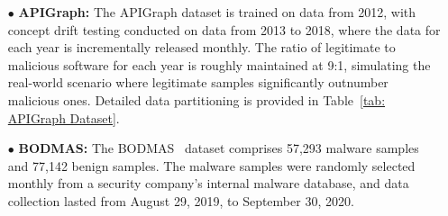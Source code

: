 \documentclass[conference,compsoc]{IEEEtran} %
\begin{document}
\begin{itemize}[leftmargin=*]
	\item[$\bullet$] \textbf{APIGraph:} The APIGraph\cite{2020-CCS-APIGraph} dataset is trained on data from 2012, with concept drift testing conducted on data from 2013 to 2018, where the data for each year is incrementally released monthly.
	The ratio of legitimate to malicious software for each year is roughly maintained at 9:1, simulating the real-world scenario where legitimate samples significantly outnumber malicious ones.
	Detailed data partitioning is provided in Table~\ref{tab: APIGraph Dataset}.

	\item[$\bullet$] \textbf{BODMAS:}
	The BODMAS~\cite{2021-PE-malware-dataset} dataset comprises 57,293 malware samples and 77,142 benign samples.
	The malware samples were randomly selected monthly from a security company's internal malware database, and data collection lasted from August 29, 2019, to September 30, 2020.


\end{itemize}
\end{document}
